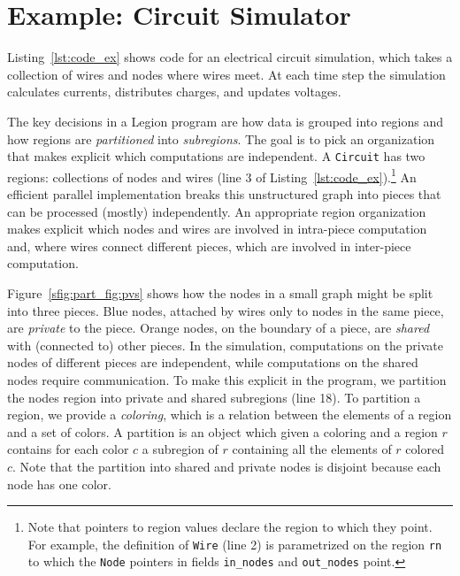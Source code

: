 \section{Example: Circuit Simulator}
\label{sec:ex}

Listing~\ref{lst:code_ex} shows code for an electrical
circuit simulation, which takes a collection of
wires and nodes where wires meet.  
At each time step the simulation calculates 
currents, distributes charges, and updates voltages.

The key decisions in a Legion program are how data is grouped into
regions and how  regions are {\em partitioned} into {\em
subregions}.  
%
%
The goal is to pick an organization that makes explicit
which computations are independent.  
A {\tt Circuit}
has two regions: collections of nodes and wires (line
3 of Listing~\ref{lst:code_ex}).\footnote{Note that pointers to region values declare the region to which they point.  For
example, the definition of {\tt Wire} (line 2) is parametrized on the region
{\tt rn} to which the {\tt Node} pointers in fields {\tt in\_nodes}
and {\tt out\_nodes} point.}
An efficient parallel
implementation breaks this unstructured graph into pieces that can be
processed (mostly) independently. An appropriate
region organization makes explicit which nodes and wires are
involved in intra-piece computation and, where wires connect different pieces,
which are involved in inter-piece computation.

%
Figure~\ref{sfig:part_fig:pvs} shows how the nodes
in a small graph might be split into three pieces.  Blue nodes,
attached by wires only to nodes in the same piece, are 
{\em private} to the piece.  Orange nodes, on the boundary of a
piece, are {\em shared} with (connected to) other pieces.
In the simulation, computations on the
private nodes of different pieces are independent, while
computations on the shared nodes require communication.  To make
this explicit in the program, we partition the nodes region into
private and shared subregions (line 18).  To partition a region, we
provide a {\em coloring}, which is a relation between the elements of
a region and a set of colors.  A partition is an object which given a
coloring and a region $r$ contains for each color $c$ a subregion of
$r$ containing all the elements of $r$ colored $c$. Note that the
partition into shared and private nodes is disjoint because each node has one color.

